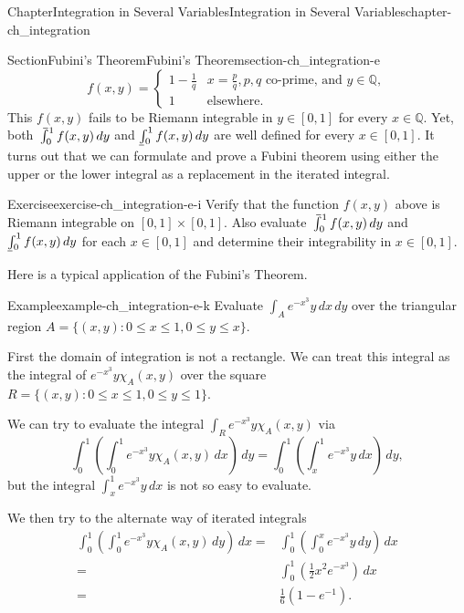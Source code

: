 \documentclass[oneside,10pt,]{book}
\makeatletter
\numberwithin{equation}{section}
\newcommand{\bbQ}{\mathbb{Q}}
\def\upint{\mathchoice
    {\mkern10mu\overline{\vphantom{\intop}\mkern7mu}\mkern-24mu}
    {\mkern7mu\overline{\vphantom{\intop}\mkern7mu}\mkern-14mu}
    {\mkern7mu\overline{\vphantom{\intop}\mkern7mu}\mkern-14mu}
    {\mkern7mu\overline{\vphantom{\intop}\mkern7mu}\mkern-14mu}
  \int}
\def\lowint{\relax\if@display
 \mkern3mu\underline{\vphantom{\intop}\mkern7mu}\mkern-10mu\int
\else 
\underline{\vphantom{\int}\mkern7mu}\mkern-10mu\int
\fi}
\newcommand{\amp}{&}
\makeatother
\begin{document}
\begin{chapterptx}{Chapter}{Integration in Several Variables}{}{Integration in Several Variables}{}{}{chapter-ch_integration}
\begin{sectionptx}{Section}{Fubini's Theorem}{}{Fubini's Theorem}{}{}{section-ch_integration-e}
\begin{equation*}
f(x, y)= \begin{cases} 1-\frac 1q \amp x=\frac pq, p, q \text{ co-prime, and $y\in \bbQ$}, \\
1 \amp \text{elsewhere.}
\end{cases}
\end{equation*}
This \(f(x,y)\) fails to be Riemann integrable in \(y\in [0, 1]\) for every \(x\in \bbQ\). Yet, both \(\upint_{0}^{1} f(x, y)\, dy\) and \(\lowint_{0}^{1} f(x, y)\, dy\) are well defined for every \(x\in [0, 1]\). It turns out that we can formulate and prove a Fubini theorem using either the upper or the lower integral as a replacement in the iterated integral.%
\begin{inlineexercise}{Exercise}{}{exercise-ch_integration-e-i}%
Verify that the function \(f(x, y)\) above is Riemann integrable on \([0, 1]\times [0, 1]\). Also evaluate \(\upint_{0}^{1} f(x, y)\, dy\) and \(\lowint_{0}^{1} f(x, y)\, dy\) for each \(x \in [0, 1]\) and determine their integrability in \(x \in [0, 1]\).%
\end{inlineexercise}%
Here is a typical application of the Fubini's Theorem.%
\begin{example}{Example}{}{example-ch_integration-e-k}%
Evaluate \(\int_{A} e^{-x^{3}}y\, dx\, dy\) over the triangular region \(A=\{(x, y): 0\le x \le 1, 0\le y \le x\}\).%
\par
First the domain of integration is not a rectangle. We can treat this integral as the integral of \(e^{-x^{3}}y \chi_{A}(x, y)\) over the square \(R=\{(x, y): 0\le x \le 1, 0\le y \le 1\}\).%
\par
We can try to evaluate the integral \(\int_{R} e^{-x^{3}}y \chi_{A}(x, y)\) via%
\begin{equation*}
\int_{0}^{1} \left( \int_{0}^{1} e^{-x^{3}}y \chi_{A}(x, y) \, dx \right)\, dy
=\int_{0}^{1} \left( \int_{x}^{1} e^{-x^{3}}y\, dx \right)\, dy,
\end{equation*}
but the integral \(\int_{x}^{1} e^{-x^{3}}y\, dx\) is not so easy to evaluate.%
\par
We then try to the alternate way of iterated integrals%
\begin{align*}
\int_{0}^{1} \left( \int_{0}^{1} e^{-x^{3}}y \chi_{A}(x, y) \, dy \right)\, dx
=\amp \int_{0}^{1} \left( \int_{0}^{x} e^{-x^{3}}y  \, dy \right)\, dx \\
=\amp \int_{0}^{1} \left(\frac 12 x^{2} e^{-x^{3}} \right)\, dx\\
=\amp \frac 16 \left(1-e^{-1}\right). 

\end{align*}
\end{example}
\end{sectionptx}
\end{chapterptx}
\end{document}
